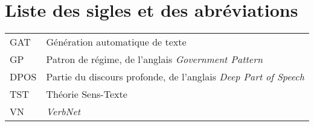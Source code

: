\cleardoublepage
{}  %
\tableofcontents				%
\cleardoublepage
{}
\listoftables
\cleardoublepage
{}
\listoffigures	



\chapter*{Liste des sigles et des abréviations}
\begingroup %
\renewcommand{\arraystretch}{2} 
\noindent\begin{tabular}{p{} p{}}
  GAT & Génération automatique de texte \\
  GP & Patron de régime, de l'anglais \textit{Government Pattern}\\
  DPOS  &  Partie du discours profonde, de l'anglais \textit{Deep Part of Speech}\\
  TST & Théorie Sens-Texte\\
  VN & \emph{ VerbNet}\\
\end{tabular}
\endgroup  %


